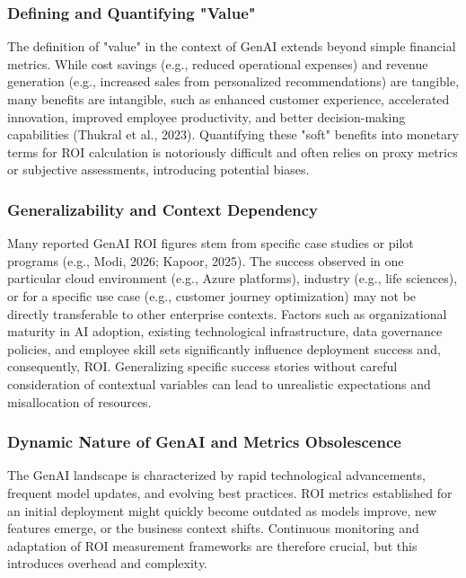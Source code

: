\documentclass{article}
\begin{document}
\subsubsection{Defining and Quantifying "Value"}

The definition of "value" in the context of GenAI extends beyond simple financial metrics. While cost savings (e.g., reduced operational expenses) and revenue generation (e.g., increased sales from personalized recommendations) are tangible, many benefits are intangible, such as enhanced customer experience, accelerated innovation, improved employee productivity, and better decision-making capabilities (Thukral et al., 2023). Quantifying these "soft" benefits into monetary terms for ROI calculation is notoriously difficult and often relies on proxy metrics or subjective assessments, introducing potential biases.


\subsubsection{Generalizability and Context Dependency}

Many reported GenAI ROI figures stem from specific case studies or pilot programs (e.g., Modi, 2026; Kapoor, 2025). The success observed in one particular cloud environment (e.g., Azure platforms), industry (e.g., life sciences), or for a specific use case (e.g., customer journey optimization) may not be directly transferable to other enterprise contexts. Factors such as organizational maturity in AI adoption, existing technological infrastructure, data governance policies, and employee skill sets significantly influence deployment success and, consequently, ROI. Generalizing specific success stories without careful consideration of contextual variables can lead to unrealistic expectations and misallocation of resources.


\subsubsection{Dynamic Nature of GenAI and Metrics Obsolescence}

The GenAI landscape is characterized by rapid technological advancements, frequent model updates, and evolving best practices. ROI metrics established for an initial deployment might quickly become outdated as models improve, new features emerge, or the business context shifts. Continuous monitoring and adaptation of ROI measurement frameworks are therefore crucial, but this introduces overhead and complexity.
\end{document}
